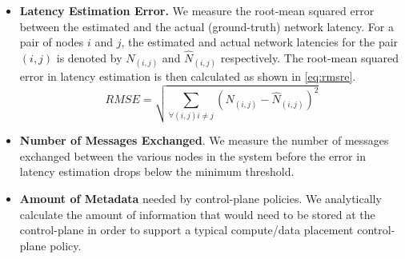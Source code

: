 \begin{itemize}
\item \textbf{Latency Estimation Error.} We measure the root-mean squared error between the estimated and the actual (ground-truth) network latency. For a pair of nodes $i$ and $j$, the estimated and actual network latencies for the pair $\left( i, j\right)$ is denoted by $N_{\left( i, j\right)}$ and $\hat{N}_{\left( i, j\right)}$ respectively. The root-mean squared error in latency estimation is then calculated as shown in \cref{eq:rmsre}.
\begin{equation}
\label{eq:rmsre}
RMSE = \sqrt{\sum_{\forall \left(i, j \right) i \neq j}{\left(N_{\left( i, j\right)} - \hat{N}_{\left( i, j\right)}\right)^2}}
\end{equation}
\item \textbf{Number of Messages Exchanged}. We measure the number of messages exchanged between the various nodes in the system before the error in latency estimation drops below the minimum threshold.
\item \textbf{Amount of Metadata} needed by control-plane policies. We analytically calculate the amount of information that would need to be stored at the control-plane in order to support a typical compute/data placement control-plane policy.
\end{itemize}

